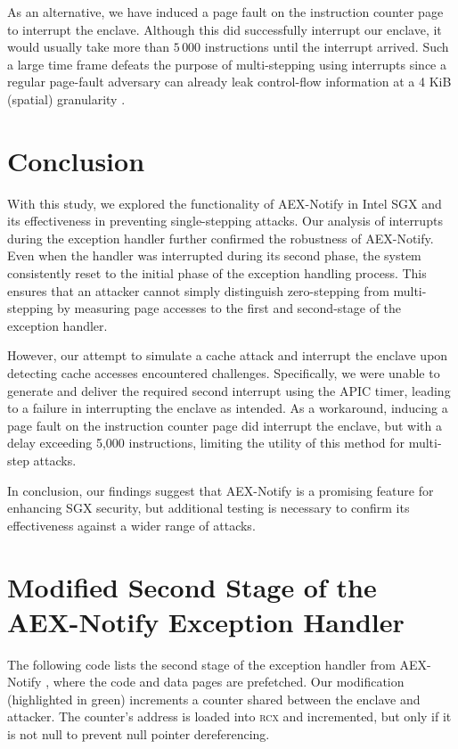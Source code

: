\documentclass{llncs}
\begin{document}
As an alternative, we have induced a page fault on the instruction counter page
to interrupt the enclave.
Although this did successfully interrupt our enclave, it would usually take
more than $5\,000$ instructions until the interrupt arrived.
Such a large time frame defeats the purpose of multi-stepping using interrupts
since a regular page-fault adversary can already leak control-flow information
at a 4 KiB (spatial) granularity \cite{XuCP15}.

\section{Conclusion}

With this study, we explored the functionality of AEX-Notify in Intel SGX and
its effectiveness in preventing single-stepping attacks.
Our analysis of interrupts during the exception handler further confirmed the
robustness of AEX-Notify.
Even when the handler was interrupted during its second phase, the system
consistently reset to the initial phase of the exception handling process.
This ensures that an attacker cannot simply distinguish zero-stepping from
multi-stepping by measuring page accesses to the first and second-stage of the
exception handler.

However, our attempt to simulate a cache attack and interrupt the enclave upon
detecting cache accesses encountered challenges.
Specifically, we were unable to generate and deliver the required second
interrupt using the APIC timer, leading to a failure in interrupting the
enclave as intended.
As a workaround, inducing a page fault on the instruction counter page did
interrupt the enclave, but with a delay exceeding 5,000 instructions, limiting
the utility of this method for multi-step attacks.

In conclusion, our findings suggest that AEX-Notify is a promising feature for
enhancing SGX security, but additional testing is necessary to confirm its
effectiveness against a wider range of attacks.


%


\clearpage
\appendix

\section{Modified Second Stage of the AEX-Notify Exception Handler}
\label{apx:modification}

The following code lists the second stage of the exception handler from
AEX-Notify \cite{ConstableBCXXAK23}, where the code and data pages are
prefetched.
Our modification (highlighted in green) increments a counter shared between the
enclave and attacker.
The counter's address is loaded into \textsc{rcx} and incremented, but only if
it is not null to prevent null pointer dereferencing.
\end{document}
